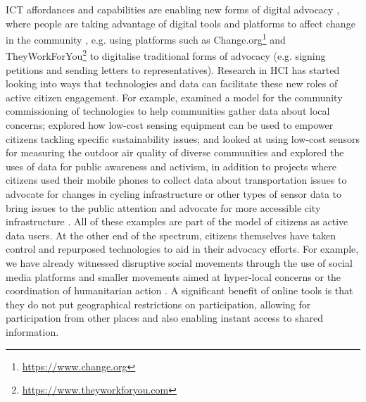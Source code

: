 ICT affordances and capabilities are enabling new forms of digital advocacy \citep{brady_utilizing_2015}, where people are taking advantage of digital tools and platforms to affect change in the community \citep{karpf_online_2010}, e.g. using platforms such as Change.org\footnote{\url{https://www.change.org}} and TheyWorkForYou\footnote{\url{https://www.theyworkforyou.com}} to digitalise traditional forms of advocacy (e.g. signing petitions and sending letters to representatives). Research in HCI has started looking into ways that technologies and data can facilitate these new roles of active citizen engagement. For example, \citet{garbett_app_2016} examined a model for the community commissioning of technologies to help communities gather data about local concerns; \citet{balestrini_beyond_2014} explored how low-cost sensing equipment can be used to empower citizens tackling specific sustainability issues; and \citep{kuznetsov_participatory_2010} looked at using low-cost sensors for measuring the outdoor air quality of diverse communities and explored the uses of data for public awareness and activism, in addition to projects where citizens used their mobile phones to collect data about transportation issues to advocate for changes in cycling infrastructure \citep{ dantec_data-based_2014,dantec_advocating_2016,maskell_spokespeople:_2018} or other types of sensor data to bring issues to the public attention and advocate for more accessible city infrastructure \citep{rodger_technology_2016}. All of these examples are part of the model of citizens as active data users. At the other end of the spectrum, citizens themselves have taken control and repurposed technologies to aid in their advocacy efforts. For example, we have already witnessed disruptive social movements through the use of social media platforms \citep{eltantawy_social_2011,howard_opening_2011} and smaller movements aimed at hyper-local concerns \citet{crivellaro_pool_2014} or the coordination of humanitarian action \citep{starbird_chatter_2010,starbird_voluntweeters:_2011}. A significant benefit of online tools is that they do not put geographical restrictions on participation, allowing for participation from other places and also enabling instant access to shared information.

